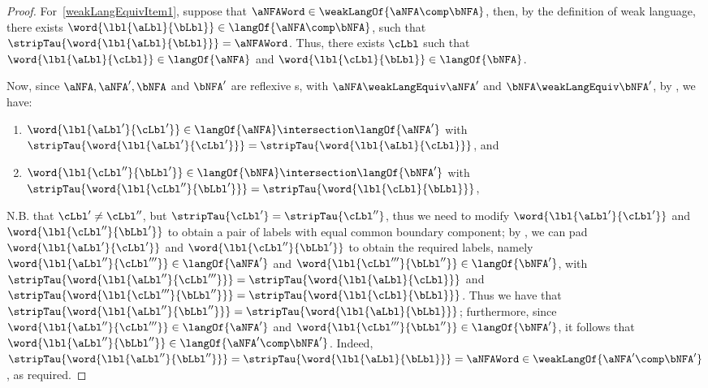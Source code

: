 \begin{proof}
    For~\ref{weakLangEquivItem1}, suppose that $\aNFAWord \in
    \weakLangOf{\aNFA \comp \bNFA}$, then, by the definition of weak language,
    there exists $\word{\lbl{\aLbl}{\bLbl}} \in \langOf{\aNFA \comp \bNFA}$,
    such that $\stripTau{\word{\lbl{\aLbl}{\bLbl}}} = \aNFAWord$.
    Thus, there exists $\cLbl$ such that $\word{\lbl{\aLbl}{\cLbl}} \in
    \langOf{\aNFA}$ and $\word{\lbl{\cLbl}{\bLbl}} \in \langOf{\bNFA}$.

    Now, since $\aNFA, \aNFA', \bNFA$ and $\bNFA'$ are reflexive \TNFA{}s, with
    $\aNFA \weakLangEquiv \aNFA'$ and $\bNFA \weakLangEquiv \bNFA'$, by
    , we have:
    \begin{enumerate}
        \item $\word{\lbl{\aLbl'}{\cLbl'}} \in \langOf{\aNFA} \intersection
            \langOf{\aNFA'}$ with $\stripTau{\word{\lbl{\aLbl'}{\cLbl'}}} =
            \stripTau{\word{\lbl{\aLbl}{\cLbl}}}$, and
        \item $\word{\lbl{\cLbl''}{\bLbl'}} \in \langOf{\bNFA} \intersection
            \langOf{\bNFA'}$ with $\stripTau{\word{\lbl{\cLbl''}{\bLbl'}}} =
            \stripTau{\word{\lbl{\cLbl}{\bLbl}}}$,
    \end{enumerate}
    N.B. that $\cLbl' \neq \cLbl''$, but $\stripTau{\cLbl'} =
    \stripTau{\cLbl''}$, thus we need to modify $\word{\lbl{\aLbl'}{\cLbl'}}$
    and $\word{\lbl{\cLbl''}{\bLbl'}}$ to obtain a pair of labels with equal
    common boundary component; by , we can pad
    $\word{\lbl{\aLbl'}{\cLbl'}}$ and $\word{\lbl{\cLbl''}{\bLbl'}}$ to obtain
    the required labels, namely $\word{\lbl{\aLbl''}{\cLbl'''}} \in
    \langOf{\aNFA'}$ and $\word{\lbl{\cLbl'''}{\bLbl''}} \in \langOf{\bNFA'}$,
    with $\stripTau{\word{\lbl{\aLbl''}{\cLbl'''}}} =
    \stripTau{\word{\lbl{\aLbl}{\cLbl}}}$ and
    $\stripTau{\word{\lbl{\cLbl'''}{\bLbl''}}} =
    \stripTau{\word{\lbl{\cLbl}{\bLbl}}}$. Thus we have that
    $\stripTau{\word{\lbl{\aLbl''}{\bLbl''}}} =
    \stripTau{\word{\lbl{\aLbl}{\bLbl}}}$; furthermore, since
    $\word{\lbl{\aLbl''}{\cLbl'''}} \in \langOf{\aNFA'}$ and
    $\word{\lbl{\cLbl'''}{\bLbl''}} \in \langOf{\bNFA'}$, it follows that
    $\word{\lbl{\aLbl''}{\bLbl''}} \in \langOf{\aNFA' \comp \bNFA'}$. Indeed,
    $\stripTau{\word{\lbl{\aLbl''}{\bLbl''}}} =
    \stripTau{\word{\lbl{\aLbl}{\bLbl}}} = \aNFAWord \in \weakLangOf{\aNFA'
    \comp \bNFA'}$, as required.


\end{proof}
